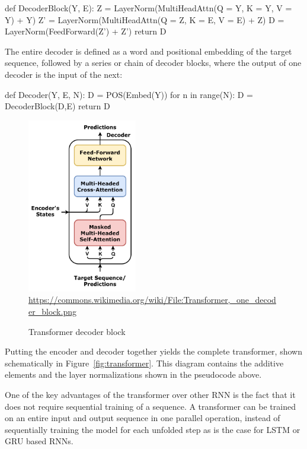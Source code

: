 \begin{textcode}
def DecoderBlock(Y, E):
  Z = LayerNorm(MultiHeadAttn(Q = Y, K = Y, V = Y) + Y)
  Z' = LayerNorm(MultiHeadAttn(Q = Z, K = E, V = E) + Z)
  D = LayerNorm(FeedForward(Z') + Z')
  return D
\end{textcode}

The entire decoder is defined as a word and positional embedding of the target sequence, followed by a series or chain of decoder blocks, where the output of one decoder is the input of the next:

\begin{textcode}
def Decoder(Y, E, N):
  D = POS(Embed(Y))
  for n in range(N):
    D = DecoderBlock(D,E)
  return D
\end{textcode}

\begin{figure}
\begin{center}
\includegraphics[height=3in]{Transformer,_one_decoder_block.png} \\

\scriptsize \url{https://commons.wikimedia.org/wiki/File:Transformer,_one_decoder_block.png}\normalsize
\end{center}
\caption{Transformer decoder block}
\label{fig:transformerdecoder}
\end{figure}

Putting the encoder and decoder together yields the complete transformer, shown schematically in Figure~\ref{fig:transformer}. This diagram contains the additive elements and the layer normalizations shown in the pseudocode above. 

One of the key advantages of the transformer over other RNN is the fact that it does not require sequential training of a sequence. A transformer can be trained on an entire input and output sequence in one parallel operation, instead of sequentially training the model for each unfolded step as is the case for LSTM or GRU based RNNs.

